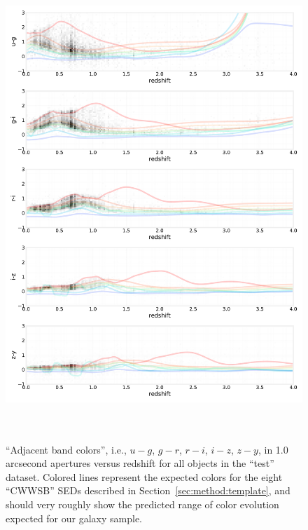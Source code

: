 \begin{figure}
    \centering
    \includegraphics[height=7in]{figures/color_v_redshift.pdf}
    \caption{``Adjacent band colors'', i.e., $u-g$, $g-r$, $r-i$, $i-z$, $z-y$, in 1.0 arcsecond apertures versus redshift for all objects in the ``test'' dataset.  Colored lines represent the expected colors for the eight ``CWWSB'' SEDs described in Section~\ref{sec:method:template}, and should very roughly show the predicted range of color evolution expected for our galaxy sample.}
    \label{fig:dp_color_v_redshift}
\end{figure}

